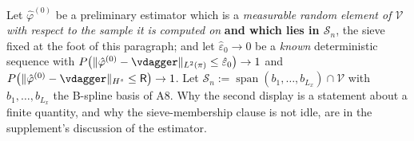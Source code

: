\begin{definition}\label{def:lfstep}
Let $\hat\varphi^{(0)}$ be a preliminary estimator which is a \emph{measurable random element of
$\mathcal V$ with respect to the sample it is computed on} \textbf{and which lies in $\mathcal S_n$}, the
sieve fixed at the foot of this paragraph; and let $\hat\varepsilon_0\to0$ be a \emph{known}
deterministic sequence with
$P\big(\|\hat\varphi^{(0)}-\vdagger\|_{L^{2}(\pi)}\le\hat\varepsilon_0\big)\to1$ and
$P\big(\|\hat\varphi^{(0)}-\vdagger\|_{H^{s}}\le\mathsf R\big)\to1$. Let
$\mathcal S_n:=\operatorname{span}(b_1,\dots,b_{L_x})\cap\mathcal V$ with $b_1,\dots,b_{L_x}$
the B-spline basis of A8. Why the second display is a statement about a finite quantity, and why the
sieve-membership clause is not idle, are in the supplement's discussion of the estimator.


\end{definition}
